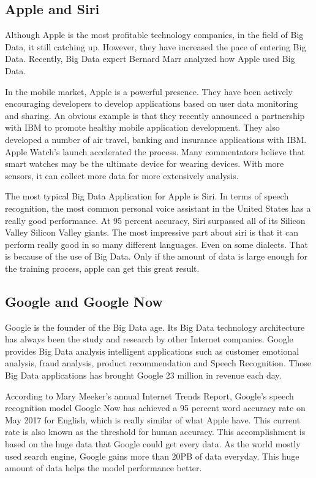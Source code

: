 \documentclass[sigconf]{acmart}
\begin{document}
\subsection{Apple and Siri}
Although Apple is the most profitable technology companies, in the field of Big Data, it still catching up. However, they have increased the pace of entering Big Data. Recently, Big Data expert Bernard Marr analyzed how Apple used Big Data.\cite{siri}

In the mobile market, Apple is a powerful presence. They have been actively encouraging developers to develop applications based on user data monitoring and sharing. An obvious example is that they recently announced a partnership with IBM to promote healthy mobile application development. They also developed a number of air travel, banking and insurance applications with IBM. Apple Watch's launch accelerated the process. Many commentators believe that smart watches may be the ultimate device for wearing devices. With more sensors, it can collect more data for more extensively analysis.

The most typical Big Data Application for Apple is Siri. In terms of speech recognition, the most common personal voice assistant in the United States has a really good performance. At 95 percent accuracy, Siri surpassed all of its Silicon Valley Silicon Valley giants. The most impressive part about siri is that it can perform really good in so many different languages. Even on some dialects. That is because of the use of Big Data. Only if the amount of data is large enough for the training process, apple can get this great result.

\subsection{Google and Google Now}
Google is the founder of the Big Data age. Its Big Data technology architecture has always been the study and research by other  Internet companies. Google provides Big Data analysis intelligent applications such as customer emotional analysis, fraud analysis, product recommendation and Speech Recognition. Those Big Data applications has brought Google 23 million in revenue each day.

According to Mary Meeker's annual Internet Trends Report,\cite{google} Google's speech recognition model Google Now has achieved a 95 percent word accuracy rate on May 2017 for English, which is really similar of what Apple have. This current rate is also known as the threshold for human accuracy. This accomplishment is based on the huge data that Google could get every data. As the world mostly used search engine, Google gains more than 20PB of data everyday. This huge amount of data helps the model performance better.
\end{document}
